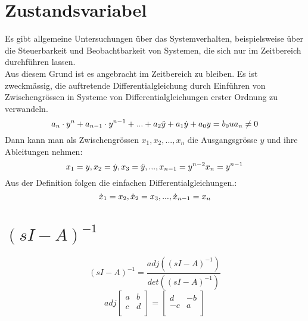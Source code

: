 \section{Zustandsvariabel}
Es gibt allgemeine Untersuchungen über das Systemverhalten, beispielsweise über die Steuerbarkeit und Beobachtbarkeit von Systemen, die sich nur im Zeitbereich durchführen lassen.\\
Aus diesem Grund ist es angebracht im Zeitbereich zu bleiben. Es ist zweckmässig, die auftretende Differentialgleichung durch Einführen von Zwischengrössen in Systeme von Differentialgleichungen erster Ordnung zu verwandeln.
\[
	a_n\cdot y^n+a_{n-1} \cdot y^{n-1}+...+a_2\ddot{y} +a_1\dot{y}+ a_0y=b_0u 
	\\ a_n\neq 0
\]
Dann kann man als Zwischengrössen $x_1,x_2,...,x_n$ die Ausgangsgrösse $y$ und ihre Ableitungen nehmen:
\[
	x_1=y,	\\	x_2=\dot{y},	\\ x_3=\ddot{y},...,	\\x_{n-1}=y^{n-2}	\\	x_n=y^{n-1}
\]
Aus der Definition folgen die einfachen Differentialgleichungen.:
\[
	\dot{x}_1=x_2,	\\	\dot{x}_2=x_3	\\,...,	\\ 	\dot{x}_{n-1}=x_n
\]
\section{$(sI-A)^{-1}$}
\[
	(sI-A)^{-1} = \frac{adj((sI-A)^{-1})}{det((sI-A)^{-1})}
\]
\[
	adj
	\begin{bmatrix}
		a & b \\
		c & d\\
	\end{bmatrix}
	=
	\begin{bmatrix}
			d & -b \\
			-c & a\\
	\end{bmatrix}
\]